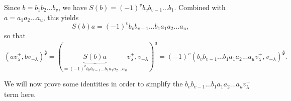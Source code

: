 \documentclass
[numbers=enddot,12pt,final,onecolumn,german,notitlepage]{scrartcl}%
\theoremstyle{definition}
\begin{document}
Since $b=b_{1}b_{2}...b_{v}$, we have $S\left(  b\right)  =\left(  -1\right)
^{v}b_{v}b_{v-1}...b_{1}$. Combined with $a=a_{1}a_{2}...a_{u}$, this yields%
\[
S\left(  b\right)  a=\left(  -1\right)  ^{v}b_{v}b_{v-1}...b_{1}a_{1}%
a_{2}...a_{u},
\]
so that%
\begin{equation}
\left(  av_{\lambda}^{+},bv_{-\lambda}^{-}\right)  ^{\overline{\mathfrak{g}}%
}=\left(  \underbrace{S\left(  b\right)  a}_{=\left(  -1\right)  ^{v}%
b_{v}b_{v-1}...b_{1}a_{1}a_{2}...a_{u}}v_{\lambda}^{+},v_{-\lambda}%
^{-}\right)  ^{\overline{\mathfrak{g}}}=\left(  -1\right)  ^{v}\left(
b_{v}b_{v-1}...b_{1}a_{1}a_{2}...a_{u}v_{\lambda}^{+},v_{-\lambda}^{-}\right)
^{\overline{\mathfrak{g}}}. \label{prop.det.US.pf.4}%
\end{equation}


We will now prove some identities in order to simplify the $b_{v}%
b_{v-1}...b_{1}a_{1}a_{2}...a_{u}v_{\lambda}^{+}$ term here.
\end{document}
